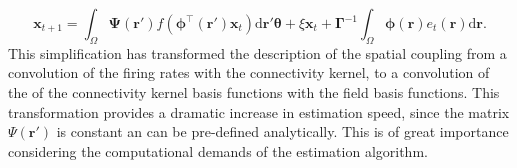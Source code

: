 \documentclass[10pt]{article}
\begin{document}
\begin{equation}
	\mathbf{x}_{t+1} = \int_\Omega \boldsymbol{\Psi}(\mathbf{r}') f(\boldsymbol{\phi}^{\top}(\mathbf{r}')\mathbf{x}_t) \textrm{d}\mathbf{r}' \boldsymbol{\theta} + \xi\mathbf{x}_t 
+ \boldsymbol{\Gamma}^{-1} \int_\Omega{\boldsymbol{\phi}(\mathbf{r})e_t(\mathbf{r})\textrm{d}\mathbf{r}}.
\end{equation}
This simplification has transformed the description of the spatial coupling from a convolution of the firing rates with the connectivity kernel, to a convolution of the of the connectivity kernel basis functions with the field basis functions. This transformation provides a dramatic increase in estimation speed, since the matrix $\Psi(\mathbf{r}')$ is constant an can be pre-defined analytically. This is of great importance considering the computational demands of the estimation algorithm. 

\end{document}
